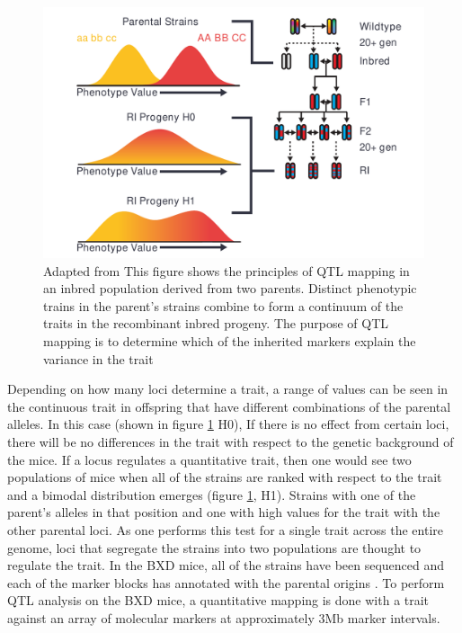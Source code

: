 \documentclass[a4paper,11pt,twoside]{book}
\begin{document}
	\begin{figure}[ht!]
		\includegraphics[width=\linewidth]{QTL_Results/QTL_Introduction.pdf}
		\caption{Adapted from \citep{Williams2017ResourcesGenetics} This figure shows the principles of QTL mapping in an inbred population derived from two parents. Distinct phenotypic trains in the parent's strains combine to form a continuum of the traits in the recombinant inbred progeny. The purpose of QTL mapping is to determine which of the inherited markers explain the variance in the trait}
		\label{fig:QTL Explanation}
	\end{figure}
	
    Depending on how many loci determine a trait, a range of values can be seen in the continuous trait in offspring that have different combinations of the parental alleles. In this case (shown in figure \ref{fig:QTL Explanation} H0), If there is no effect from certain loci, there will be no differences in the trait with respect to the genetic background of the mice. If a locus regulates a quantitative trait, then one would see two populations of mice when all of the strains are ranked with respect to the trait and a bimodal distribution emerges (figure \ref{fig:QTL Explanation}, H1). Strains with one of the parent's alleles in that position and one with high values for the trait with the other parental loci\citep{Mackay2009TheProspects}. As one performs this test for a single trait across the entire genome, loci that segregate the strains into two populations are thought to regulate the trait. In the BXD mice, all of the strains have been sequenced and each of the marker blocks has annotated with the parental origins \citep{Mulligan2017GeneNetworkGenetics}.  To perform QTL analysis on the BXD mice, a quantitative mapping is done with a trait against an array of molecular markers at approximately 3Mb marker intervals. 
	
\end{document}
